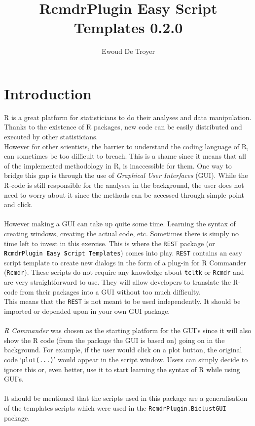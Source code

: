 \documentclass[a4paper]{article}\usepackage[]{graphicx}\usepackage[]{color}
\title{RcmdrPlugin Easy Script Templates 0.2.0}
\author{Ewoud De Troyer}
\begin{document}
\maketitle
\tableofcontents
\newpage
\section{Introduction}
R is a great platform for statisticians to do their analyses and data
manipulation. Thanks to the existence of R packages, new code can be easily
distributed and executed by other statisticians.\\
However for other scientists, the barrier to understand the coding language of
R, can sometimes be too difficult to breach. This is a shame since it means that
all of the implemented methodology in R, is inaccessible for them. One way to
bridge this gap is through the use of {\it Graphical User Interfaces} (GUI). While the R-code is
still responsible for the analyses in the background, the user does not need to
worry about it since the methods can be accessed through simple point and click.
\\ \\
However making a GUI can take up quite some time. Learning the syntax of
creating windows, creating the actual code, etc. Sometimes there is simply no
time left to invest in this exercise. This is where the \texttt{REST} package (or
\texttt{{\bf R}cmdrPlugin {\bf E}asy {\bf S}cript {\bf T}emplates}) comes into
play. \texttt{REST} contains an easy script template to create new dialogs in
the form of a plug-in for R Commander (\texttt{Rcmdr}). These scripts do not
require any knowledge about \texttt{tcltk} or \texttt{Rcmdr} and are very
straightforward to use. They will allow developers to translate the R-code from
their packages into a GUI without too much difficulty.\\
This means that the \texttt{REST} is not meant to be used independently. It
should be imported or depended upon in your own GUI package.
\\ \\
{\it R Commander} was chosen as the starting platform for the GUI's since it
will also show the R code (from the package the GUI is based on) going on in the
background. For example, if the user would click on a plot button, the original
code `\texttt{plot(...)}' would appear in the script window. Users can simply
decide to ignore this or, even better, use it to start learning the syntax of R
while using GUI's.
\\ \\
It should be mentioned that the scripts used in this package are a
generalisation of the templates scripts which were used in the
\texttt{RcmdrPlugin.BiclustGUI} package.
\end{document}
